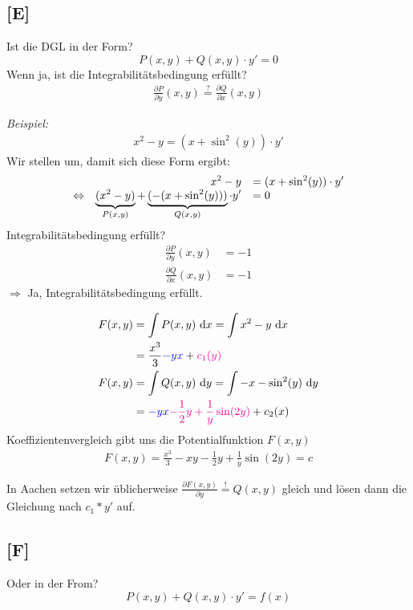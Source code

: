 \documentclass[main.tex]{subfiles}
\begin{document}
\subsection{[E]}
Ist die DGL in der Form?
$$
	P(x,y) + Q(x,y)\cdot y' = 0
$$
Wenn ja, ist die Integrabilitätsbedingung erfüllt?
\begin{align*}
	\frac{\partial P}{\partial y} (x,y) \overset{?}{=} \frac{\partial Q}{\partial x}(x,y)
\end{align*}

\textit{Beispiel:}\\
\begin{align*}
	x^2 -y = (x + \sin^2(y))\cdot y'
\end{align*}
Wir stellen um, damit sich diese Form ergibt: 
\[\everymath={\displaystyle}\begin{array}{crl}
				& x^2 -y &= (x + \sin^2(y)) \cdot y' \\
\Leftrightarrow & \underbrace{(x^2 -y)}_{P(x,y)} + \underbrace{(-(x+\sin^2(y)))}_{Q(x,y)} \cdot y' & = 0 \\
\end{array}\]
Integrabilitätsbedingung erfüllt?
\begin{align*}
	\frac{\partial P}{\partial y}(x,y) &= -1 \\
	\frac{\partial Q}{\partial x}(x,y) &= -1 
\end{align*}
$\Rightarrow$ Ja, Integrabilitätsbedingung erfüllt.

\begin{align*}
	F(x,y) &= \int P(x,y) ~\mathrm{d}x = \int x^2 -y ~\mathrm{d}x \\
		&= \frac{x^3}{3} \textcolor{blue}{-y x} + \textcolor{magenta}{c_1(y)} \\
	F(x,y) &= \int Q(x,y) ~\mathrm{d}y = \int -x - \sin^2(y) ~\mathrm{d}y \\
		&= \textcolor{blue}{-y x} \textcolor{magenta}{-\frac{1}{2}y + \frac{1}{y} \sin(2 y)} + c_2(x)\\
\end{align*}
Koeffizientenvergleich gibt uns die Potentialfunktion $F(x,y)$
\begin{align*}
	F(x,y) = \frac{x^3}{3} -xy -\frac{1}{2}y + \frac{1}{y} \sin(2 y) = c
\end{align*}

In Aachen setzen wir üblicherweise $\frac{\partial F(x,y)}{\partial y} \overset{!}{=} Q(x,y)$ gleich und lösen dann die Gleichung nach $c_1 * y'$ auf.

\subsection{[F]}
\vspace{6cm}
Oder in der From? 
$$
	P(x,y) + Q(x,y)\cdot y' = f(x)
$$
\end{document}
